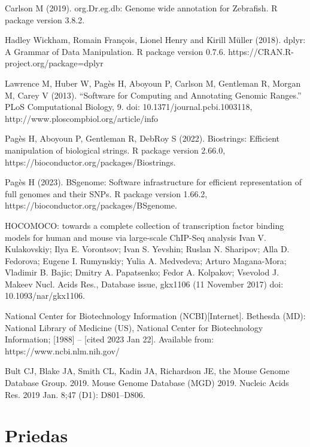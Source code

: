 \documentclass[12pt]{article}
\begin{document}
\begin{thebibliography}{99}
 Carlson M (2019). org.Dr.eg.db: Genome wide annotation for
Zebrafish. R package version 3.8.2.

 Hadley Wickham, Romain François, Lionel Henry and Kirill Müller
(2018). dplyr: A Grammar of Data Manipulation. R package version 0.7.6.
https://CRAN.R-project.org/package=dplyr

 Lawrence M, Huber W, Pagès H, Aboyoun P, Carlson M,
Gentleman R, Morgan M, Carey V (2013). “Software for Computing and Annotating
Genomic Ranges.” PLoS Computational Biology, 9.
doi: 10.1371/journal.pcbi.1003118,
http://www.ploscompbiol.org/article/info%

 Pagès H, Aboyoun P, Gentleman R, DebRoy S (2022).
Biostrings: Efficient manipulation of biological strings. R package version
2.66.0, https://bioconductor.org/packages/Biostrings.

 Pagès H (2023). BSgenome: Software infrastructure for
efficient representation of full genomes and their SNPs. R package version
1.66.2, https://bioconductor.org/packages/BSgenome.

 HOCOMOCO: towards a complete collection of transcription
factor binding models for human and mouse via large-scale ChIP-Seq analysis
Ivan V. Kulakovskiy; Ilya E. Vorontsov; Ivan S. Yevshin; Ruslan N. Sharipov;
Alla D. Fedorova; Eugene I. Rumynskiy; Yulia A. Medvedeva; Arturo Magana-Mora;
Vladimir B. Bajic; Dmitry A. Papatsenko; Fedor A. Kolpakov; Vsevolod J. Makeev
Nucl. Acids Res., Database issue, gkx1106 (11 November 2017)
doi: 10.1093/nar/gkx1106.

 National Center for Biotechnology Information (NCBI)[Internet].
Bethesda (MD): National Library of Medicine (US), National Center for
Biotechnology Information; [1988] – [cited 2023 Jan 22]. Available from:
https://www.ncbi.nlm.nih.gov/

 Bult CJ, Blake JA, Smith CL, Kadin JA, Richardson JE, the
Mouse Genome Database Group. 2019. Mouse Genome Database (MGD) 2019.
Nucleic Acids Res. 2019 Jan. 8;47 (D1): D801–D806.
\end{thebibliography}

\newpage


\section{Priedas} \label{Priedas}
\end{document}
